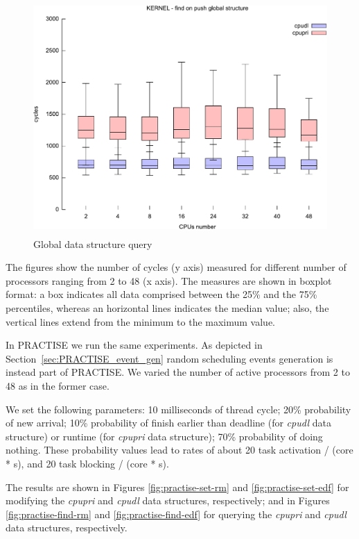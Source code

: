 \begin{figure}[htbp]
	\centering
	\includegraphics[height=3.5in, keepaspectratio]{images/kernel_find.pdf}
	\caption{Global data structure query}
	\label{fig:kernel-find}
\end{figure}

The figures show the number of cycles (y axis) measured for different number of processors
ranging from 2 to 48 (x axis). The measures are shown in boxplot format: a box indicates all
data comprised between the 25\% and the 75\% percentiles, whereas an horizontal lines 
indicates the median value; also, the vertical lines extend from the minimum to the maximum
value.

In PRACTISE we run the same experiments. As depicted in Section~\ref{sec:PRACTISE_event_gen}
random scheduling events generation is instead part of PRACTISE. We varied the number of
active processors from 2 to 48 as in the former case.

We set the following parameters: 10 milliseconds of thread cycle; 20\% probability of new
arrival; 10\% probability of finish earlier than deadline (for \emph{cpudl} data structure)
or runtime (for \emph{cpupri} data structure); 70\% probability of doing nothing. These
probability values lead to rates of about 20 task activation / (core * s), and 20 task blocking
/ (core * s).

The results are shown in Figures \ref{fig:practise-set-rm} and \ref{fig:practise-set-edf} 
for modifying the \emph{cpupri} and \emph{cpudl} data structures, respectively; and in 
Figures \ref{fig:practise-find-rm} and \ref{fig:practise-find-edf} for querying the \emph{cpupri} 
and \emph{cpudl} data structures, respectively.

